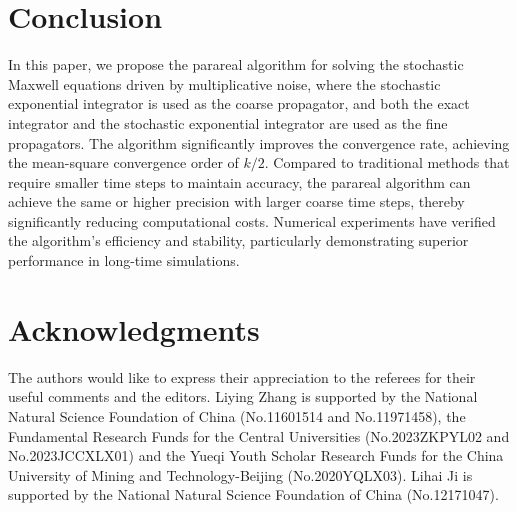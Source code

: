 \documentclass[preprint,12pt]{elsarticle}
\begin{document}
\section{Conclusion}\label{sec8}
In this paper, we propose the parareal algorithm for solving the stochastic Maxwell equations driven by multiplicative noise, where the stochastic exponential integrator is used as the coarse propagator, and both the exact integrator and the stochastic exponential integrator are used as the fine propagators. The algorithm significantly improves the convergence rate, achieving the mean-square convergence order of $k/2$. Compared to traditional methods that require smaller time steps to maintain accuracy, the parareal algorithm can achieve the same or higher precision with larger coarse time steps, thereby significantly reducing computational costs. Numerical experiments have verified the algorithm's efficiency and stability, particularly demonstrating superior performance in long-time simulations.
\section*{Acknowledgments}
The authors would like to express their appreciation to the referees for their useful comments and the editors. Liying Zhang is supported by 
the National Natural Science Foundation of China (No.11601514 and No.11971458), the Fundamental Research Funds for the Central Universities (No.2023ZKPYL02 and No.2023JCCXLX01) and the Yueqi Youth Scholar Research Funds for the China University of Mining and Technology-Beijing (No.2020YQLX03). Lihai Ji is supported by the National Natural Science Foundation of China (No.12171047).
%


\end{document}
